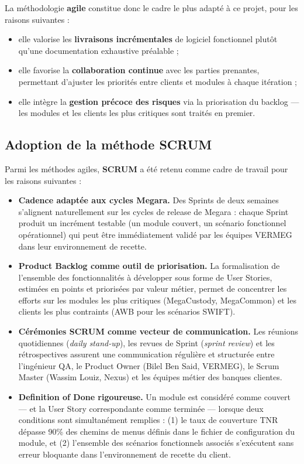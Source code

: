 \documentclass[12pt, a4paper]{report}
\begin{document}
La méthodologie \textbf{agile} constitue donc le cadre le plus adapté à ce projet, pour les raisons suivantes :
\begin{itemize}
  \item elle valorise les \textbf{livraisons incrémentales} de logiciel fonctionnel plutôt qu'une documentation exhaustive préalable ;
  \item elle favorise la \textbf{collaboration continue} avec les parties prenantes, permettant d'ajuster les priorités entre clients et modules à chaque itération ;
  \item elle intègre la \textbf{gestion précoce des risques} via la priorisation du backlog — les modules et les clients les plus critiques sont traités en premier.
\end{itemize}

\subsection{Adoption de la méthode SCRUM}

Parmi les méthodes agiles, \textbf{SCRUM} a été retenu comme cadre de travail pour les raisons suivantes :

\begin{itemize}

  \item \textbf{Cadence adaptée aux cycles Megara.}
  Des Sprints de deux semaines s'alignent naturellement sur les cycles de release de Megara : chaque Sprint produit un incrément testable (un module couvert, un scénario fonctionnel opérationnel) qui peut être immédiatement validé par les équipes VERMEG dans leur environnement de recette.

  \item \textbf{Product Backlog comme outil de priorisation.}
  La formalisation de l'ensemble des fonctionnalités à développer sous forme de User Stories, estimées en points et priorisées par valeur métier, permet de concentrer les efforts sur les modules les plus critiques (MegaCustody, MegaCommon) et les clients les plus contraints (AWB pour les scénarios SWIFT).

  \item \textbf{Cérémonies SCRUM comme vecteur de communication.}
  Les réunions quotidiennes (\textit{daily stand-up}), les revues de Sprint (\textit{sprint review}) et les rétrospectives assurent une communication régulière et structurée entre l'ingénieur QA, le Product Owner (Bilel Ben Said, VERMEG), le Scrum Master (Wassim Louiz, Nexus) et les équipes métier des banques clientes.

  \item \textbf{Definition of Done rigoureuse.}
  Un module est considéré comme couvert — et la User Story correspondante comme terminée — lorsque deux conditions sont simultanément remplies : (1) le taux de couverture TNR dépasse 90\% des chemins de menus définis dans le fichier de configuration du module, et (2) l'ensemble des scénarios fonctionnels associés s'exécutent sans erreur bloquante dans l'environnement de recette du client.

\end{itemize}
\end{document}
